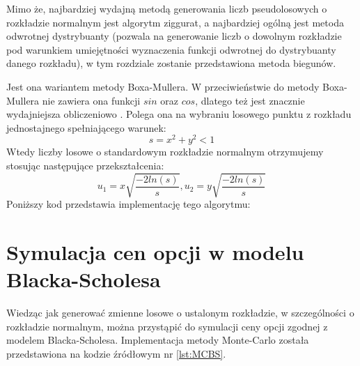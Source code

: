 \documentclass{pracamgr}
\begin{document}
{Mimo że, najbardziej wydajną metodą generowania liczb pseudolosowych o rozkładzie normalnym jest algorytm ziggurat, a najbardziej ogólną jest metoda odwrotnej dystrybuanty (pozwala na generowanie liczb o dowolnym rozkładzie pod warunkiem umiejętności wyznaczenia funkcji odwrotnej do dystrybuanty danego rozkładu), w tym rozdziale zostanie przedstawiona metoda biegunów.

Jest ona wariantem metody Boxa-Mullera. W przeciwieństwie do metody 
Boxa-Mullera nie zawiera ona funkcji $sin$ oraz $cos$, dlatego też jest znacznie wydajniejsza obliczeniowo \cite{Korn}.
Polega ona na wybraniu losowego punktu z rozkładu jednostajnego spełniającego warunek:
\begin{equation}
  s = x^2 + y^2 < 1
\end{equation}
Wtedy liczby losowe o standardowym rozkładzie normalnym otrzymujemy stosując następujące przekształcenia:
\begin{equation}
  u_1 = x \sqrt{\frac{-2ln(s)}{s}}, u_2 = y \sqrt{\frac{-2ln(s)}{s}}
\end{equation}
Poniższy kod przedstawia implementację tego algorytmu:




\section{Symulacja cen opcji w modelu Blacka-Scholesa}

Wiedząc jak generować zmienne losowe o ustalonym rozkładzie, w szczególności o rozkładzie normalnym, można 
przystąpić do symulacji ceny opcji zgodnej z modelem Blacka-Scholesa.
Implementacja metody Monte-Carlo została przedstawiona na kodzie źródłowym nr \ref{lst:MCBS}.


 



}
\end{document}
